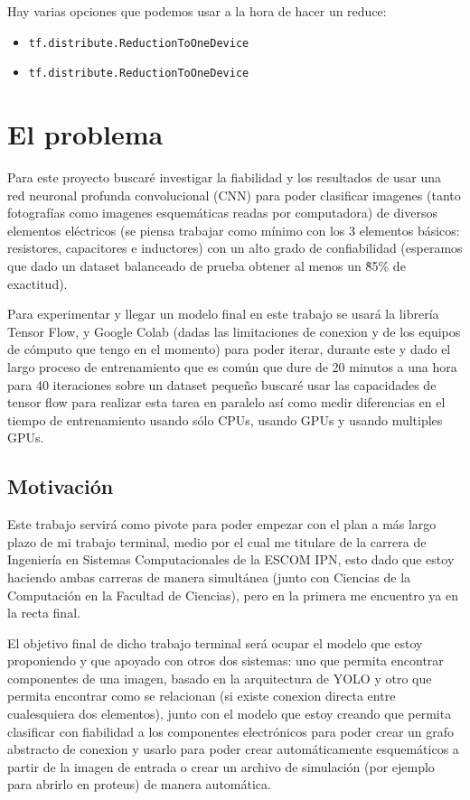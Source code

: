 \documentclass[10pt, fleqn, journal]{IEEEtran}
\theoremstyle{break}                                            %
\begin{document}
    Hay varias opciones que podemos usar a la hora de hacer un reduce:

    \begin{itemize}
      \item \texttt{tf.distribute.ReductionToOneDevice}
      \item \texttt{tf.distribute.ReductionToOneDevice}
    \end{itemize}

  \section{El problema}
    
    Para este proyecto buscaré investigar la fiabilidad y los resultados de usar una red neuronal profunda 
    convolucional  (CNN) para poder clasificar imagenes (tanto fotografías como imagenes esquemáticas 
    readas por computadora) de diversos elementos eléctricos (se piensa trabajar como mínimo con los 
    3 elementos básicos: resistores, capacitores e inductores) con un alto grado de confiabilidad 
    (esperamos que dado un dataset balanceado de prueba obtener al menos un \~85\% de exactitud).

    Para experimentar y llegar un modelo final en este trabajo se usará la librería Tensor Flow, y 
    Google Colab (dadas las limitaciones de conexion y de los equipos de cómputo que tengo en el momento) 
    para poder iterar, durante este y dado el largo proceso de entrenamiento que es común que dure de 20
    minutos a una hora para 40 iteraciones sobre un dataset pequeño buscaré usar las capacidades de 
    tensor flow para realizar esta tarea en paralelo así como medir diferencias en el tiempo de
    entrenamiento usando sólo CPUs, usando GPUs y usando multiples GPUs.
    
    \subsection{Motivación}
    
      Este trabajo servirá como pivote para poder empezar con el plan a más largo plazo de mi trabajo 
      terminal, medio por el cual me titulare de la carrera de Ingeniería en Sistemas Computacionales 
      de la ESCOM IPN, esto dado que estoy haciendo ambas carreras de manera simultánea (junto con 
      Ciencias de la Computación en la Facultad de Ciencias), pero en la primera me encuentro 
      ya en la recta final.

      El objetivo final de dicho trabajo terminal será ocupar el modelo que estoy proponiendo y que 
      apoyado con otros dos sistemas: uno que permita encontrar componentes de una imagen, basado en 
      la arquitectura de YOLO y otro que permita encontrar como se relacionan (si existe conexion 
      directa entre cualesquiera dos elementos), junto con el modelo que estoy creando que permita 
      clasificar con fiabilidad a los componentes electrónicos para poder crear un grafo abstracto 
      de conexion y usarlo para poder crear automáticamente esquemáticos a partir de la imagen de 
      entrada o crear un archivo de simulación (por ejemplo para abrirlo en proteus) 
      de manera automática.
    
\end{document}
